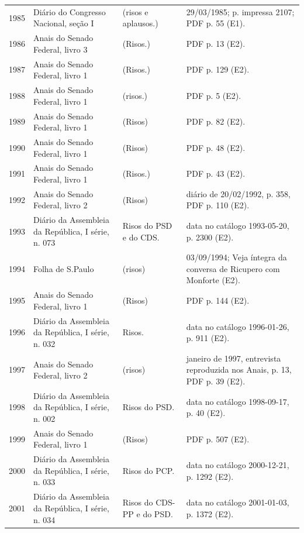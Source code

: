 \begin{longtable}{p{}p{}p{}p{}}
1985 & Diário do Congresso Nacional, seção I \cite{camara1985} & (risos e aplausos.) & 29/03/1985; p. impressa 2107; PDF p. 55 (E1). \\
1986 & Anais do Senado Federal, livro 3 \cite{anual1986} & (Risos.) & PDF p. 13 (E2). \\
1987 & Anais do Senado Federal, livro 1 \cite{anual1987} & (Risos.) & PDF p. 129 (E2). \\
1988 & Anais do Senado Federal, livro 1 \cite{anual1988} & (risos.) & PDF p. 5 (E2). \\
1989 & Anais do Senado Federal, livro 1 \cite{anual1989} & (Risos) & PDF p. 82 (E2). \\
1990 & Anais do Senado Federal, livro 1 \cite{anual1990} & (Risos) & PDF p. 48 (E2). \\
1991 & Anais do Senado Federal, livro 1 \cite{anual1991} & (Risos.) & PDF p. 43 (E2). \\
1992 & Anais do Senado Federal, livro 2 \cite{anual1992} & (Risos) & diário de 20/02/1992, p. 358, PDF p. 110 (E2). \\
1993 & Diário da Assembleia da República, I série, n. 073 \cite{anual1993} & Risos do PSD e do CDS. & data no catálogo 1993-05-20, p. 2300 (E2). \\
1994 & Folha de S.Paulo \cite{folha1994} & (risos) & 03/09/1994; Veja íntegra da conversa de Ricupero com Monforte (E2). \\
1995 & Anais do Senado Federal, livro 1 \cite{anual1995} & (Risos) & PDF p. 144 (E2). \\
1996 & Diário da Assembleia da República, I série, n. 032 \cite{anual1996} & Risos. & data no catálogo 1996-01-26, p. 911 (E2). \\
1997 & Anais do Senado Federal, livro 2 \cite{anual1997} & (risos) & janeiro de 1997, entrevista reproduzida nos Anais, p. 13, PDF p. 39 (E2). \\
1998 & Diário da Assembleia da República, I série, n. 002 \cite{anual1998} & Risos do PSD. & data no catálogo 1998-09-17, p. 40 (E2). \\
1999 & Anais do Senado Federal, livro 1 \cite{anual1999} & (Risos) & PDF p. 507 (E2). \\
2000 & Diário da Assembleia da República, I série, n. 033 \cite{anual2000} & Risos do PCP. & data no catálogo 2000-12-21, p. 1292 (E2). \\
2001 & Diário da Assembleia da República, I série, n. 034 \cite{anual2001} & Risos do CDS-PP e do PSD. & data no catálogo 2001-01-03, p. 1372 (E2). \\

\end{longtable}

